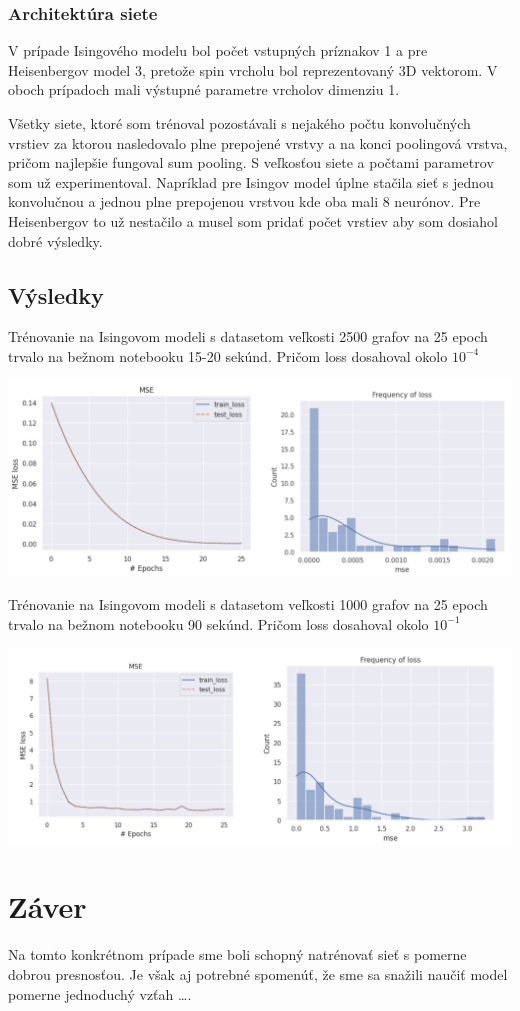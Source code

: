 \documentclass{article}
\begin{document}
\subsubsection*{Architektúra siete}
V prípade Isingového modelu bol počet vstupných príznakov 1 a pre Heisenbergov model 3, pretože spin vrcholu bol reprezentovaný 3D vektorom. V oboch prípadoch mali výstupné parametre vrcholov dimenziu 1. 

Všetky siete, ktoré som trénoval pozostávali s nejakého počtu konvolučných vrstiev za ktorou nasledovalo plne prepojené vrstvy a na konci poolingová vrstva, pričom najlepšie fungoval sum pooling. S veľkosťou siete a počtami parametrov som už experimentoval. Napríklad pre Isingov model úplne stačila sieť s jednou konvolučnou a jednou plne prepojenou vrstvou kde oba mali 8 neurónov. Pre Heisenbergov to už nestačilo a musel som pridať počet vrstiev aby som dosiahol dobré výsledky.  

\subsection*{Výsledky}
Trénovanie na Isingovom modeli s datasetom veľkosti 2500 grafov na 25 epoch trvalo na bežnom notebooku 15-20 sekúnd. Pričom loss dosahoval okolo $10^{-4}$ 
\begin{center}
    \includegraphics*[scale=0.2]{ising_path.png}
\end{center}

Trénovanie na Isingovom modeli s datasetom veľkosti 1000 grafov na 25 epoch trvalo na bežnom notebooku 90 sekúnd. Pričom loss dosahoval okolo $10^{-1}$ 

\begin{center}
    \includegraphics*[scale=0.28]{heisenberg_path.png}
\end{center}


\section*{Záver}
Na tomto konkrétnom prípade sme boli schopný natrénovať sieť s pomerne dobrou presnosťou. Je však aj potrebné spomenúť, že sme sa snažili naučiť model pomerne jednoduchý vzťah \dots.



\end{document}

